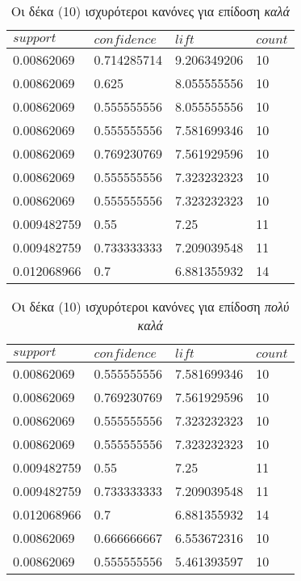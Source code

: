 \documentclass[12pt,a4paper,final]{article}
\begin{document}
\begin{table}
\centering
\caption{Οι δέκα (10) ισχυρότεροι κανόνες για επίδοση \textit{καλά}}
\label{table_good}
\begin{tabular}{|l|l|l|l|} 
\hline
\textbf{$support$} & \textbf{$confidence$} & \textbf{$lift$} & \textbf{$count$}  \\ 
\hline
0.00862069       & 0.714285714         & 9.206349206   & 10              \\ 
\hline
0.00862069       & 0.625               & 8.055555556   & 10              \\ 
\hline
0.00862069       & 0.555555556         & 8.055555556   & 10              \\ 
\hline
0.00862069       & 0.555555556         & 7.581699346   & 10              \\ 
\hline
0.00862069       & 0.769230769         & 7.561929596   & 10              \\ 
\hline
0.00862069       & 0.555555556         & 7.323232323   & 10              \\ 
\hline
0.00862069       & 0.555555556         & 7.323232323   & 10              \\ 
\hline
0.009482759      & 0.55                & 7.25          & 11              \\ 
\hline
0.009482759      & 0.733333333         & 7.209039548   & 11              \\ 
\hline
0.012068966      & 0.7                 & 6.881355932   & 14              \\
\hline
\end{tabular}
\end{table}

\begin{table}
\centering
\caption{Οι δέκα (10) ισχυρότεροι κανόνες για επίδοση \textit{πολύ καλά}}
\label{table_great}
\begin{tabular}{|l|l|l|l|} 
\hline
\textbf{$support$} & \textbf{$confidence$} & \textbf{$lift$} & \textbf{$count$}  \\ 
\hline
0.00862069       & 0.555555556         & 7.581699346   & 10              \\ 
\hline
0.00862069       & 0.769230769         & 7.561929596   & 10              \\ 
\hline
0.00862069       & 0.555555556         & 7.323232323   & 10              \\ 
\hline
0.00862069       & 0.555555556         & 7.323232323   & 10              \\ 
\hline
0.009482759      & 0.55                & 7.25          & 11              \\ 
\hline
0.009482759      & 0.733333333         & 7.209039548   & 11              \\ 
\hline
0.012068966      & 0.7                 & 6.881355932   & 14              \\ 
\hline
0.00862069       & 0.666666667         & 6.553672316   & 10              \\ 
\hline
0.00862069       & 0.555555556         & 5.461393597   & 10              \\
\hline
\end{tabular}
\end{table}
\end{document}
